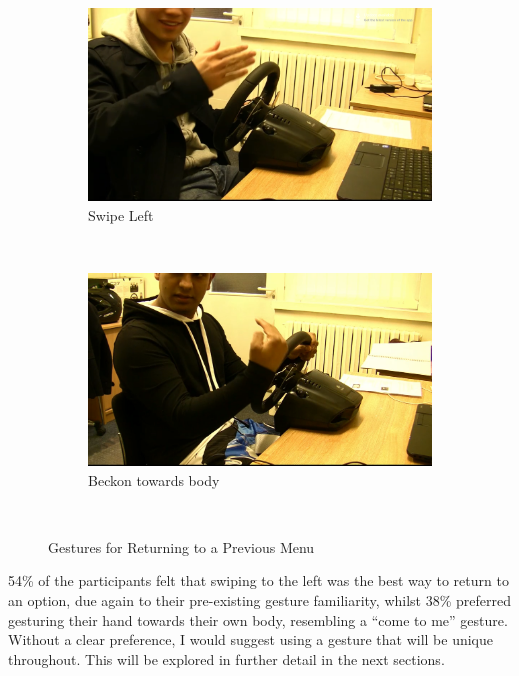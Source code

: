 \documentclass{l4proj}
\begin{document}
\begin{figure}[h!]
\centering
\begin{subfigure}[b]{0.4\textwidth}
\includegraphics[width=\textwidth]{images/SwipeLeft.png}
\caption{Swipe Left}
\label{fig:swipeleft}
\end{subfigure}
~ %
\begin{subfigure}[b]{0.4\textwidth}
\includegraphics[width=\textwidth]{images/beckon.png}
\caption{Beckon towards body}
\label{fig:beckon}
\end{subfigure}
~ %
\caption{Gestures for Returning to a Previous Menu}\label{fig:goback}
\end{figure}

54\% of the participants felt that swiping to the left was the best way to return to an option, due again to their pre-existing gesture familiarity, whilst 38\% preferred gesturing their hand towards their own body, resembling a “come to me” gesture. Without a clear preference, I would suggest using a gesture that will be unique throughout. This will be explored in further detail in the next sections.
\end{document}
